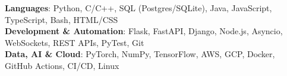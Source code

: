 \begin{itemize}[leftmargin=0.15in, label={}]
    \small{\item{
     \textbf{Languages}{: Python, C/C++, SQL (Postgres/SQLite), Java, JavaScript, TypeScript, Bash, HTML/CSS} \\
     \textbf{Development \& Automation}{: Flask, FastAPI, Django, Node.js, Asyncio, WebSockets, REST APIs, PyTest, Git} \\
     \textbf{Data, AI \& Cloud}{: PyTorch, NumPy, TensorFlow, AWS, GCP, Docker, GitHub Actions, CI/CD, Linux}
    }}
\end{itemize}
